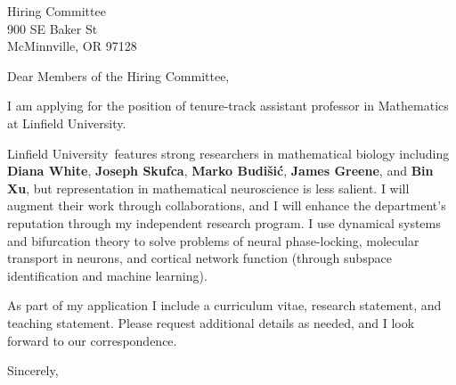 \documentclass[11pt,a4paper]{letter}
\begin{document}
\def\School{Linfield University}
\begin{letter}
{Hiring Committee\\
900 SE Baker St\\
McMinnville, OR 97128}


\opening{Dear Members of the Hiring Committee,}

I am applying for the position of tenure-track assistant professor in Mathematics at \School. 



\School~features strong researchers in mathematical biology including \textbf{Diana White}, \textbf{Joseph Skufca}, \textbf{Marko Budišić}, \textbf{James Greene}, and \textbf{Bin Xu}, but representation in mathematical neuroscience is less salient. I will augment their work through collaborations, and I will enhance the department's reputation through my independent research program. I use dynamical systems and bifurcation theory to solve problems of neural phase-locking, molecular transport in neurons, and cortical network function (through subspace identification and machine learning).



As part of my application I include a curriculum vitae, research statement, and teaching statement. Please request additional details as needed, and I look forward to our correspondence.

\closing{Sincerely,}
\end{letter}
\end{document}
